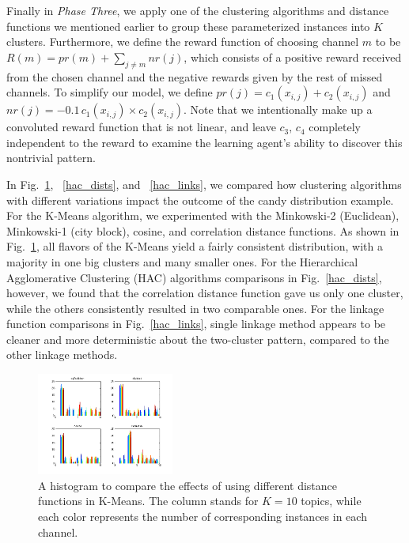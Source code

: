 \documentclass[conference]{IEEEtran}
\begin{document}
Finally in \emph{Phase Three}, we apply one of the clustering algorithms and distance functions we mentioned earlier to group these parameterized instances into $K$ clusters. Furthermore, we define the reward function of choosing channel $m$ to be $R(m) = pr(m) + \sum_{j \neq m}nr(j)$, which consists of a positive reward received from the chosen channel and the negative rewards given by the rest of missed channels. To simplify our model, we define $pr(j) = c_1(x_{i,j}) + c_2(x_{i,j})$ and $nr(j) = -0.1\, c_1(x_{i,j})\times c_2(x_{i,j})$. Note that we intentionally make up a convoluted reward function that is not linear, and leave $c_3,\,c_4$ completely independent to the reward to examine the learning agent's ability to discover this nontrivial pattern. 

In Fig.~\ref{kmeans_dists}, ~\ref{hac_dists}, and ~\ref{hac_links}, we compared how clustering algorithms with different variations impact the outcome of the candy distribution example. For the K-Means algorithm, we experimented with the Minkowski-2 (Euclidean), Minkowski-1 (city block), cosine, and correlation distance functions. As shown in Fig.~\ref{kmeans_dists}, all flavors of the K-Means yield a fairly consistent distribution, with a majority in one big clusters and many smaller ones. For the Hierarchical Agglomerative  Clustering (HAC) algorithms comparisons in Fig.~\ref{hac_dists}, however, we found that the correlation distance function gave us only one cluster, while the others consistently resulted in two comparable ones. For the linkage function comparisons in Fig.~\ref{hac_links}, single linkage method appears to be cleaner and more deterministic about the two-cluster pattern, compared to the other linkage methods. 

\begin{figure}[h]
	\center	
	\includegraphics[width=0.4\textwidth]{fig/kmeans_dists.png}
	\caption{A histogram to compare the effects of using different distance functions in K-Means. The column stands for $K=10$ topics, while each color represents the number of corresponding instances in each channel.}
	\label{kmeans_dists}
\end{figure}
\end{document}
